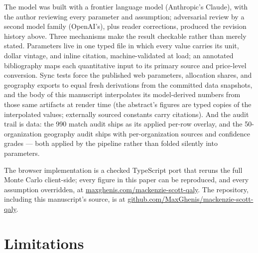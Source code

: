 \documentclass[
  11pt,
  letterpaper,
  DIV=11,
  numbers=noendperiod]{scrartcl}
\begin{document}
The model was built with a frontier language model (Anthropic's Claude),
with the author reviewing every parameter and assumption; adversarial
review by a second model family (OpenAI's), plus reader corrections,
produced the revision history above. Three mechanisms make the result
checkable rather than merely stated. Parameters live in one typed file
in which every value carries its unit, dollar vintage, and inline
citation, machine-validated at load; an annotated bibliography maps each
quantitative input to its primary source and price-level conversion.
Sync tests force the published web parameters, allocation shares, and
geography exports to equal fresh derivations from the committed data
snapshots, and the body of this manuscript interpolates its
model-derived numbers from those same artifacts at render time (the
abstract's figures are typed copies of the interpolated values;
externally sourced constants carry citations). And the audit trail is
data: the 990 match audit ships as its applied per-row overlay, and the
50-organization geography audit ships with per-organization sources and
confidence grades --- both applied by the pipeline rather than folded
silently into parameters.

The browser implementation is a checked TypeScript port that reruns the
full Monte Carlo client-side; every figure in this paper can be
reproduced, and every assumption overridden, at
\href{https://maxghenis.com/mackenzie-scott-qaly}{maxghenis.com/mackenzie-scott-qaly}.
The repository, including this manuscript's source, is at
\href{https://github.com/MaxGhenis/mackenzie-scott-qaly}{github.com/MaxGhenis/mackenzie-scott-qaly}.

\section{Limitations}\label{limitations}
\end{document}
